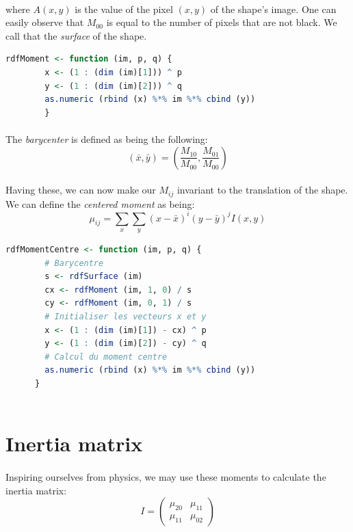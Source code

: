 \paragraph{}
where $A(x, y)$ is the value of the pixel $(x, y)$ of the shape's image. One can easily observe that $M_{00}$ is equal to the number of pixels that are not black. We call that the \emph{surface} of the shape.

\begin{lstlisting}[language=R, caption=Calculating the moment of a shape]
    rdfMoment <- function (im, p, q) {
        x <- (1 : (dim (im)[1])) ^ p
        y <- (1 : (dim (im)[2])) ^ q
        as.numeric (rbind (x) %*% im %*% cbind (y))
        }
\end{lstlisting}

\paragraph{}
The \emph{barycenter} is defined as being the following:
$$(\bar{x}, \bar{y}) = (\frac{M_{10}} {M_{00}}, \frac{M_{01}} {M_{00}})$$

\paragraph{}
Having these, we can now make our $M_{ij}$ invariant to the translation of the shape. We can define the \emph{centered moment} as being:
$$\mu_{ij} = \sum_{x}\sum_{y} (x - \bar{x})^i(y - \bar{y})^j I(x, y)$$

\begin{lstlisting}[language=R, caption=Calculating centered moments]
    rdfMomentCentre <- function (im, p, q) {
        # Barycentre
        s <- rdfSurface (im)
        cx <- rdfMoment (im, 1, 0) / s
        cy <- rdfMoment (im, 0, 1) / s
        # Initialiser les vecteurs x et y
        x <- (1 : (dim (im)[1]) - cx) ^ p
        y <- (1 : (dim (im)[2]) - cy) ^ q
        # Calcul du moment centre
        as.numeric (rbind (x) %*% im %*% cbind (y))
      }
      
\end{lstlisting}

\section{Inertia matrix}
\paragraph{}
Inspiring ourselves from physics, we may use these moments to calculate the inertia matrix:
$$ I = 
\begin{pmatrix}
    \mu_{20} & \mu_{11}\\
    \mu_{11} & \mu_{02}
\end{pmatrix}
$$

